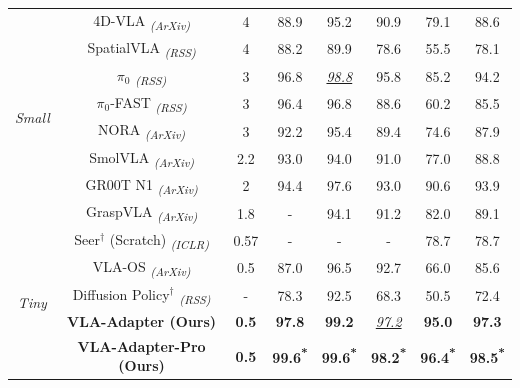 \begin{table}[t]
\begin{tabular}{ccc|cccc|c}
		\multirow{8}{*}{\textit{Small}}&4D-VLA \citep{4D-VLA-2025} \textsubscript{\textit{(ArXiv)}}&4&88.9&95.2& 90.9& 79.1& 88.6\\
		&SpatialVLA \citep{SpatialVLA-2025} \textsubscript{\textit{(RSS)}}&4& \multicolumn{1}{c}{88.2} & \multicolumn{1}{c}{89.9} & \multicolumn{1}{c}{78.6} & \multicolumn{1}{c|}{55.5} & \multicolumn{1}{c}{78.1} \\
		&$\pi_0$ \citep{pi0-2025} \textsubscript{\textit{(RSS)}}& 3&  \multicolumn{1}{c}{96.8} & \underline{\textit{98.8}} & \multicolumn{1}{c}{95.8} & \multicolumn{1}{c|}{85.2} & \multicolumn{1}{c}{94.2} \\
		&$\pi_0$-FAST \citep{pi0-FAST-2025} \textsubscript{\textit{(RSS)}}& 3 & \multicolumn{1}{c}{96.4} & \multicolumn{1}{c}{96.8} & \multicolumn{1}{c}{88.6} & \multicolumn{1}{c|}{60.2} & \multicolumn{1}{c}{85.5} \\
        &NORA \citep{NORA-2025} \textsubscript{\textit{(ArXiv)}}& 3 & \multicolumn{1}{c}{92.2} & \multicolumn{1}{c}{95.4} & \multicolumn{1}{c}{89.4} & \multicolumn{1}{c|}{74.6} & \multicolumn{1}{c}{87.9} \\
		&SmolVLA \citep{SmolVLA-2025}
		\textsubscript{\textit{(ArXiv)}}& 2.2 & 93.0    & 94.0    & 91.0    & \multicolumn{1}{c|}{77.0} & 88.8 \\	
		&GR00T N1 \citep{GR00T-N1-2025} \textsubscript{\textit{(ArXiv)}}&2 & \multicolumn{1}{c}{94.4} & \multicolumn{1}{c}{97.6} & \multicolumn{1}{c}{93.0} & \multicolumn{1}{c|}{90.6} & 93.9\\
        &GraspVLA \citep{GraspVLA-2025} \textsubscript{\textit{(ArXiv)}}& 1.8 & - & 94.1&91.2&82.0 &89.1\\
		\midrule[0.5pt]
		
		\multirow{5}{*}{\textit{Tiny}}&Seer$^{\dag}$ \citep{Seer-2025} (Scratch)  \textsubscript{\textit{(ICLR)}}&0.57  & \multicolumn{1}{c}{-} & \multicolumn{1}{c}{-} & \multicolumn{1}{c}{-} & \multicolumn{1}{c|}{78.7} & 78.7 \\
		&VLA-OS \citep{VLA-OS-2025} \textsubscript{\textit{(ArXiv)}}&0.5&87.0& 96.5 &92.7 &66.0 &85.6\\
		&Diffusion Policy$^{\dag}$ \citep{DP-2023} \textsubscript{\textit{(RSS)}}& - &  \multicolumn{1}{c}{78.3} & \multicolumn{1}{c}{92.5} & \multicolumn{1}{c}{68.3} & \multicolumn{1}{c|}{50.5} & \multicolumn{1}{c}{72.4} \\	
		
		\rowcolor[rgb]{ .900,  .900,  .900}&\textbf{VLA-Adapter (Ours)}&\textbf{0.5}&\textbf{97.8}&\textbf{99.2}&\underline{\textit{97.2}}&\textbf{95.0}& \textbf{97.3}\\
        \rowcolor[rgb]{ .900,  .900,  .900}&\textbf{VLA-Adapter-Pro (Ours)}&\textbf{0.5}&\textbf{ 99.6\textsuperscript{*}}&\textbf{ 99.6\textsuperscript{*}}&\textbf{ 98.2\textsuperscript{*}}&\textbf{ 96.4\textsuperscript{*}}& \textbf{ 98.5\textsuperscript{*}}\\
		\bottomrule[1pt]
	\end{tabular}%
\end{table}%


